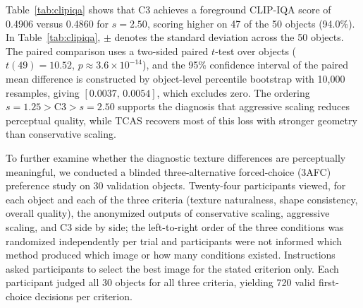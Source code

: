 
Table~\ref{tab:clipiqa} shows that C3 achieves a foreground CLIP-IQA score of 0.4906 versus 0.4860 for $s = 2.50$, scoring higher on 47 of the 50 objects (94.0\%). In Table~\ref{tab:clipiqa}, $\pm$ denotes the standard deviation across the 50 objects. The paired comparison uses a two-sided paired $t$-test over objects ($t(49)=10.52$, $p\approx3.6\times10^{-14}$), and the 95\% confidence interval of the paired mean difference is constructed by object-level percentile bootstrap with 10{,}000 resamples, giving $[0.0037,\,0.0054]$, which excludes zero. The ordering $s = 1.25 > \mathrm{C3} > s = 2.50$ supports the diagnosis that aggressive scaling reduces perceptual quality, while TCAS recovers most of this loss with stronger geometry than conservative scaling.


To further examine whether the diagnostic texture differences are perceptually meaningful, we conducted a blinded three-alternative forced-choice (3AFC) preference study on 30 validation objects. Twenty-four participants viewed, for each object and each of the three criteria (texture naturalness, shape consistency, overall quality), the anonymized outputs of conservative scaling, aggressive scaling, and C3 side by side; the left-to-right order of the three conditions was randomized independently per trial and participants were not informed which method produced which image or how many conditions existed. Instructions asked participants to select the best image for the stated criterion only. Each participant judged all 30 objects for all three criteria, yielding 720 valid first-choice decisions per criterion.

